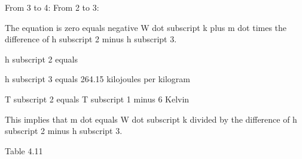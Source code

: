 From 3 to 4:
From 2 to 3:

The equation is zero equals negative W dot subscript k plus m dot times the difference of h subscript 2 minus h subscript 3.

h subscript 2 equals

h subscript 3 equals 264.15 kilojoules per kilogram

T subscript 2 equals T subscript 1 minus 6 Kelvin

This implies that m dot equals W dot subscript k divided by the difference of h subscript 2 minus h subscript 3.

Table 4.11